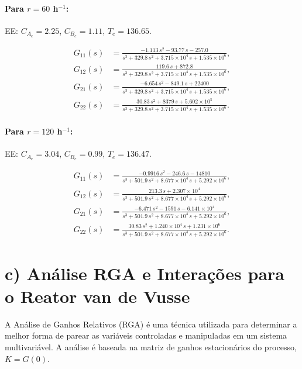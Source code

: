 \documentclass{article}
\begin{document}
\paragraph{Para $r = 60$ h$^{-1}$:}
EE: $C_{A_e} = 2.25$, $C_{B_e} = 1.11$, $T_e = 136.65$.

\begin{align*}
G_{11}(s) &= \frac{-1.113\,s^2 - 93.77\,s - 257.0}{s^3 + 329.8\,s^2 + 3.715\times 10^{4}\,s + 1.535\times 10^{6}}, \\
G_{12}(s) &= \frac{119.6\,s + 872.8}{s^3 + 329.8\,s^2 + 3.715\times 10^{4}\,s + 1.535\times 10^{6}}, \\
G_{21}(s) &= \frac{-6.654\,s^2 - 849.1\,s + 22400}{s^3 + 329.8\,s^2 + 3.715\times 10^{4}\,s + 1.535\times 10^{6}}, \\
G_{22}(s) &= \frac{30.83\,s^2 + 8379\,s + 5.602\times 10^{5}}{s^3 + 329.8\,s^2 + 3.715\times 10^{4}\,s + 1.535\times 10^{6}}.
\end{align*}

\paragraph{Para $r = 120$ h$^{-1}$:}
EE: $C_{A_e} = 3.04$, $C_{B_e} = 0.99$, $T_e = 136.47$.

\begin{align*}
G_{11}(s) &= \frac{-0.9916\,s^2 - 246.6\,s - 14810}{s^3 + 501.9\,s^2 + 8.677\times 10^{4}\,s + 5.292\times 10^{6}}, \\
G_{12}(s) &= \frac{213.3\,s + 2.307\times 10^{4}}{s^3 + 501.9\,s^2 + 8.677\times 10^{4}\,s + 5.292\times 10^{6}}, \\
G_{21}(s) &= \frac{-6.471\,s^2 - 1591\,s - 6.141\times 10^{4}}{s^3 + 501.9\,s^2 + 8.677\times 10^{4}\,s + 5.292\times 10^{6}}, \\
G_{22}(s) &= \frac{30.83\,s^2 + 1.240\times 10^{4}\,s + 1.231\times 10^{6}}{s^3 + 501.9\,s^2 + 8.677\times 10^{4}\,s + 5.292\times 10^{6}}.
\end{align*}

\section*{c) Análise RGA e Interações para o Reator van de Vusse}

A Análise de Ganhos Relativos (RGA) é uma técnica utilizada para determinar a melhor forma de parear as variáveis controladas e manipuladas em um sistema multivariável. A análise é baseada na matriz de ganhos estacionários do processo, $K = G(0)$.
\end{document}
